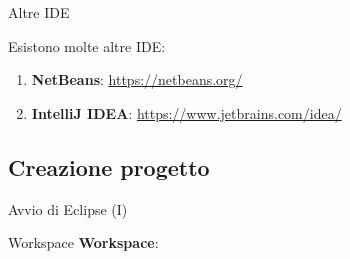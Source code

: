 \begin{frame}{Altre IDE}

  Esistono molte altre IDE:
  \begin{enumerate}
    \item \textbf{NetBeans}: \url{https://netbeans.org/}
    \item \textbf{IntelliJ IDEA}: \url{https://www.jetbrains.com/idea/}
  \end{enumerate}
\end{frame}
 
\subsection[Creazione progetto]{Creazione progetto}

\begin{frame}{Avvio di Eclipse (I)}
  \begin{center}
  \end{center}
\end{frame}

\begin{frame}{Workspace}
  \textbf{Workspace}:
  \begin{center}
  \end{center}
\end{frame}
%   

{
  
}

{
  
}


